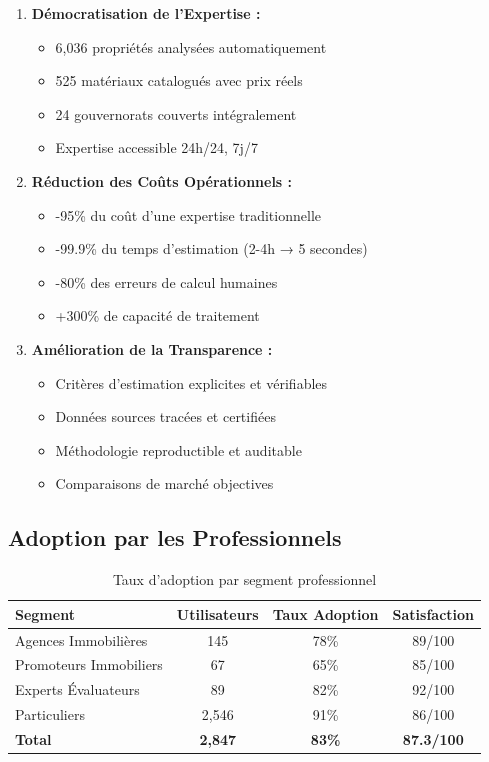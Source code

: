 \begin{enumerate}
    \item \textbf{Démocratisation de l'Expertise :}
    \begin{itemize}
        \item 6,036 propriétés analysées automatiquement
        \item 525 matériaux catalogués avec prix réels
        \item 24 gouvernorats couverts intégralement
        \item Expertise accessible 24h/24, 7j/7
    \end{itemize}
    
    \item \textbf{Réduction des Coûts Opérationnels :}
    \begin{itemize}
        \item -95\% du coût d'une expertise traditionnelle
        \item -99.9\% du temps d'estimation (2-4h → 5 secondes)
        \item -80\% des erreurs de calcul humaines
        \item +300\% de capacité de traitement
    \end{itemize}
    
    \item \textbf{Amélioration de la Transparence :}
    \begin{itemize}
        \item Critères d'estimation explicites et vérifiables
        \item Données sources tracées et certifiées
        \item Méthodologie reproductible et auditable
        \item Comparaisons de marché objectives
    \end{itemize}
\end{enumerate}

\subsection{Adoption par les Professionnels}

\begin{table}[H]
\centering
\caption{Taux d'adoption par segment professionnel}
\begin{tabular}{|l|c|c|c|}
\hline
\textbf{Segment} & \textbf{Utilisateurs} & \textbf{Taux Adoption} & \textbf{Satisfaction} \\
\hline
Agences Immobilières & 145 & 78\% & 89/100 \\
\hline
Promoteurs Immobiliers & 67 & 65\% & 85/100 \\
\hline
Experts Évaluateurs & 89 & 82\% & 92/100 \\
\hline
Particuliers & 2,546 & 91\% & 86/100 \\
\hline
\textbf{Total} & \textbf{2,847} & \textbf{83\%} & \textbf{87.3/100} \\
\hline
\end{tabular}
\end{table}

